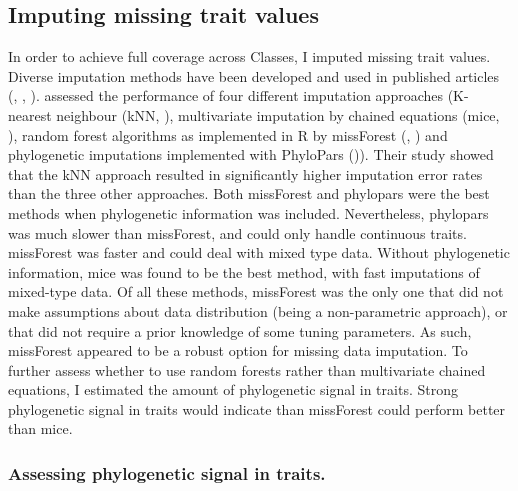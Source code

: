 \subsection{Imputing missing trait values}
In order to achieve full coverage across Classes, I imputed missing trait values. Diverse imputation methods have been developed and used in published articles (\cite{Cooke2019}, \cite{Molina-Venegas2018a}, \cite{Swenson2014}). \cite{Penone2014} assessed the performance of four different imputation approaches (K-nearest neighbour (kNN, \cite{Troyanskaya2001}), multivariate imputation by chained equations (mice, \cite{mice}), random forest algorithms as implemented in R by missForest (\cite{Stekhoven2012}, \cite{Stekhoven2016}) and phylogenetic imputations implemented with PhyloPars (\cite{Bruggeman2009})). Their study showed that the kNN approach resulted in significantly higher imputation error rates than the three other approaches. Both missForest and phylopars were the best methods when phylogenetic information was included. Nevertheless, phylopars was much slower than missForest, and could only handle continuous traits. missForest was faster and could deal with mixed type data. Without phylogenetic information, mice was found to be the best method, with fast imputations of mixed-type data. Of all these methods, missForest was the only one that did not make assumptions about data distribution (being a non-parametric approach), or that did not require a prior knowledge of some tuning parameters. As such, missForest appeared to be a robust option for missing data imputation. To further assess whether to use random forests rather than multivariate chained equations, I estimated the amount of phylogenetic signal in traits. Strong phylogenetic signal in traits would indicate than missForest could perform better than mice.

\subsubsection{Assessing phylogenetic signal in traits.}

